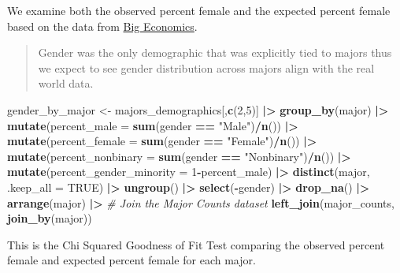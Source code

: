\documentclass[
  twocolumn]{article}
\newenvironment{Shaded}{\begin{snugshade}}{\end{snugshade}}
\newcommand{\AttributeTok}[1]{\textcolor[rgb]{0.13,0.29,0.53}{#1}}
\newcommand{\CommentTok}[1]{\textcolor[rgb]{0.56,0.35,0.01}{\textit{#1}}}
\newcommand{\ConstantTok}[1]{\textcolor[rgb]{0.56,0.35,0.01}{#1}}
\newcommand{\DecValTok}[1]{\textcolor[rgb]{0.00,0.00,0.81}{#1}}
\newcommand{\FunctionTok}[1]{\textcolor[rgb]{0.13,0.29,0.53}{\textbf{#1}}}
\newcommand{\NormalTok}[1]{#1}
\newcommand{\OtherTok}[1]{\textcolor[rgb]{0.56,0.35,0.01}{#1}}
\newcommand{\SpecialCharTok}[1]{\textcolor[rgb]{0.81,0.36,0.00}{\textbf{#1}}}
\newcommand{\StringTok}[1]{\textcolor[rgb]{0.31,0.60,0.02}{#1}}
\begin{document}
We examine both the observed percent female and the expected percent
female based on the data from
\href{https://bigeconomics.org/college-majors-explorer/}{Big Economics}.

\begin{quote}
Gender was the only demographic that was explicitly tied to majors thus
we expect to see gender distribution across majors align with the real
world data.
\end{quote}

\begin{Shaded}
\begin{Highlighting}[]
\NormalTok{gender\_by\_major }\OtherTok{\textless{}{-}}\NormalTok{ majors\_demographics[,}\FunctionTok{c}\NormalTok{(}\DecValTok{2}\NormalTok{,}\DecValTok{5}\NormalTok{)] }\SpecialCharTok{|\textgreater{}}
  \FunctionTok{group\_by}\NormalTok{(major) }\SpecialCharTok{|\textgreater{}}
  \FunctionTok{mutate}\NormalTok{(}\AttributeTok{percent\_male =} \FunctionTok{sum}\NormalTok{(gender }\SpecialCharTok{==} \StringTok{"Male"}\NormalTok{)}\SpecialCharTok{/}\FunctionTok{n}\NormalTok{()) }\SpecialCharTok{|\textgreater{}}
  \FunctionTok{mutate}\NormalTok{(}\AttributeTok{percent\_female =} \FunctionTok{sum}\NormalTok{(gender }\SpecialCharTok{==} \StringTok{"Female"}\NormalTok{)}\SpecialCharTok{/}\FunctionTok{n}\NormalTok{()) }\SpecialCharTok{|\textgreater{}}
  \FunctionTok{mutate}\NormalTok{(}\AttributeTok{percent\_nonbinary =} \FunctionTok{sum}\NormalTok{(gender }\SpecialCharTok{==} \StringTok{"Nonbinary"}\NormalTok{)}\SpecialCharTok{/}\FunctionTok{n}\NormalTok{()) }\SpecialCharTok{|\textgreater{}}
  \FunctionTok{mutate}\NormalTok{(}\AttributeTok{percent\_gender\_minority =} \DecValTok{1}\SpecialCharTok{{-}}\NormalTok{percent\_male) }\SpecialCharTok{|\textgreater{}}
  \FunctionTok{distinct}\NormalTok{(major, }\AttributeTok{.keep\_all =} \ConstantTok{TRUE}\NormalTok{) }\SpecialCharTok{|\textgreater{}}
  \FunctionTok{ungroup}\NormalTok{() }\SpecialCharTok{|\textgreater{}}
  \FunctionTok{select}\NormalTok{(}\SpecialCharTok{{-}}\NormalTok{gender) }\SpecialCharTok{|\textgreater{}}
  \FunctionTok{drop\_na}\NormalTok{() }\SpecialCharTok{|\textgreater{}}
  \FunctionTok{arrange}\NormalTok{(major) }\SpecialCharTok{|\textgreater{}}
  \CommentTok{\# Join the Major Counts dataset}
  \FunctionTok{left\_join}\NormalTok{(major\_counts, }\FunctionTok{join\_by}\NormalTok{(major))}
\end{Highlighting}
\end{Shaded}

This is the Chi Squared Goodness of Fit Test comparing the observed
percent female and expected percent female for each major.
\end{document}
